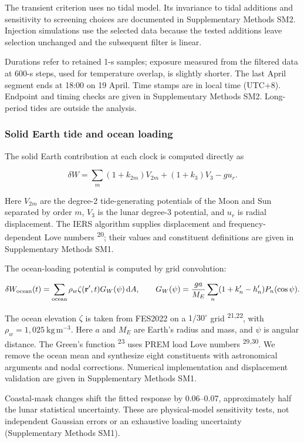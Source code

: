 \documentclass[
  11pt,
  a4paper,
]{article}
\begin{document}
The transient criterion uses no tidal model. Its invariance to tidal
additions and sensitivity to screening choices are documented in
Supplementary Methods SM2. Injection simulations use the selected data
because the tested additions leave selection unchanged and the
subsequent filter is linear.

Durations refer to retained 1-s samples; exposure measured from the
filtered data at 600-s steps, used for temperature overlap, is slightly
shorter. The last April segment ends at 18:00 on 19 April. Time stamps
are in local time (UTC+8). Endpoint and timing checks are given in
Supplementary Methods SM2. Long-period tides are outside the analysis.

\hypertarget{solid-earth-tide-and-ocean-loading}{%
\subsubsection{Solid Earth tide and ocean
loading}\label{solid-earth-tide-and-ocean-loading}}

The solid Earth contribution at each clock is computed directly as

\[
\delta W=\sum_m(1+k_{2m})V_{2m}+(1+k_3)V_3-g u_r.
\]

Here \(V_{2m}\) are the degree-2 tide-generating potentials of the Moon
and Sun separated by order \(m\), \(V_3\) is the lunar degree-3
potential, and \(u_r\) is radial displacement. The IERS algorithm
supplies displacement and frequency-dependent Love numbers
\textsuperscript{20}; their values and constituent definitions are given
in Supplementary Methods SM1.

The ocean-loading potential is computed by grid convolution:

\[
\delta W_{\rm ocean}(t)=\sum_{\rm ocean}\rho_w\zeta(\mathbf r',t)G_W(\psi)\,\mathrm dA,
\qquad
G_W(\psi)=\frac{ga}{M_E}\sum_n(1+k'_n-h'_n)P_n(\cos\psi).
\]

The ocean elevation \(\zeta\) is taken from FES2022 on a \(1/30^\circ\)
grid \textsuperscript{21,22}, with
\(\rho_w=1,025\ \mathrm{kg\,m^{-3}}\). Here \(a\) and \(M_E\) are
Earth's radius and mass, and \(\psi\) is angular distance. The Green's
function \textsuperscript{23} uses PREM load Love numbers
\textsuperscript{29,30}. We remove the ocean mean and synthesize eight
constituents with astronomical arguments and nodal corrections.
Numerical implementation and displacement validation are given in
Supplementary Methods SM1.

Coastal-mask changes shift the fitted response by 0.06--0.07,
approximately half the lunar statistical uncertainty. These are
physical-model sensitivity tests, not independent Gaussian errors or an
exhaustive loading uncertainty (Supplementary Methods SM1).
\end{document}

